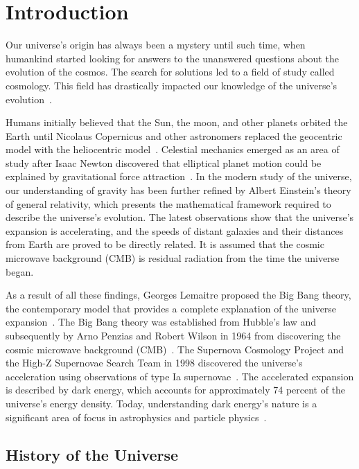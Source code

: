 \chapter{Introduction}

Our universe's origin has always been a mystery until such time, when humankind started looking for answers to the unanswered questions about the evolution of the cosmos. The search for solutions led to a field of study called cosmology. This field has drastically impacted our knowledge of the universe's evolution~\citep{book:909085}.

Humans initially believed that the Sun, the moon, and other planets orbited the Earth until Nicolaus Copernicus and other astronomers replaced the geocentric model with the heliocentric model~\citep{sep-copernicus, kanas}.  Celestial mechanics emerged as an area of study after Isaac Newton discovered that elliptical planet motion could be explained by gravitational force attraction~\citep{crowe2013theories,sep-copernicus}. In the modern study of the universe, our understanding of gravity has been further refined by Albert Einstein's theory of general relativity, which presents the mathematical framework required to describe the universe's evolution. The latest observations show that the universe's expansion is accelerating, and the speeds of distant galaxies and their distances from Earth are proved to be directly related. It is assumed that the cosmic microwave background (CMB) is residual radiation from the time the universe began.

As a result of all these findings, Georges Lemaitre proposed the Big Bang theory, the contemporary model that provides a complete explanation of the universe expansion~\citep{1926ApJ....64..321H}. The Big Bang theory was established from Hubble's law and subsequently by Arno Penzias and Robert Wilson in 1964 from discovering the cosmic microwave background (CMB)~\citep{1965ApJ...142..419P, 2003RvMP...75..559P, 1929PNAS...15..168H}. The Supernova Cosmology Project and the High-Z Supernovae Search Team in 1998 discovered the universe's acceleration using observations of type Ia supernovae~\citep{1998AJ....116.1009R, 1999ApJ...517..565P}. The accelerated expansion is described by dark energy, which accounts for approximately 74 percent of the universe's energy density. Today, understanding dark energy's nature is a significant area of focus in astrophysics and particle physics~\citep{2008ARA&A..46..385F}. 

\section{History of the Universe}


